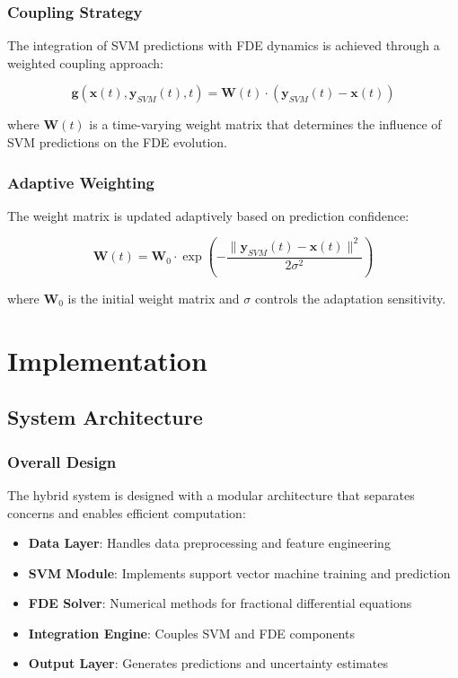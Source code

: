 \documentclass[12pt,a4paper]{report}
\begin{document}
\subsection{Coupling Strategy}

The integration of SVM predictions with FDE dynamics is achieved through a weighted coupling approach:

\begin{equation}
\mathbf{g}(\mathbf{x}(t), \mathbf{y}_{SVM}(t), t) = \mathbf{W}(t) \cdot (\mathbf{y}_{SVM}(t) - \mathbf{x}(t))
\end{equation}

where $\mathbf{W}(t)$ is a time-varying weight matrix that determines the influence of SVM predictions on the FDE evolution.

\subsection{Adaptive Weighting}

The weight matrix is updated adaptively based on prediction confidence:

\begin{equation}
\mathbf{W}(t) = \mathbf{W}_0 \cdot \exp\left(-\frac{\|\mathbf{y}_{SVM}(t) - \mathbf{x}(t)\|^2}{2\sigma^2}\right)
\end{equation}

where $\mathbf{W}_0$ is the initial weight matrix and $\sigma$ controls the adaptation sensitivity.

\newpage

\chapter{Implementation}

\section{System Architecture}

\subsection{Overall Design}

The hybrid system is designed with a modular architecture that separates concerns and enables efficient computation:

\begin{itemize}
    \item \textbf{Data Layer}: Handles data preprocessing and feature engineering
    \item \textbf{SVM Module}: Implements support vector machine training and prediction
    \item \textbf{FDE Solver}: Numerical methods for fractional differential equations
    \item \textbf{Integration Engine}: Couples SVM and FDE components
    \item \textbf{Output Layer}: Generates predictions and uncertainty estimates
\end{itemize}
\end{document}
